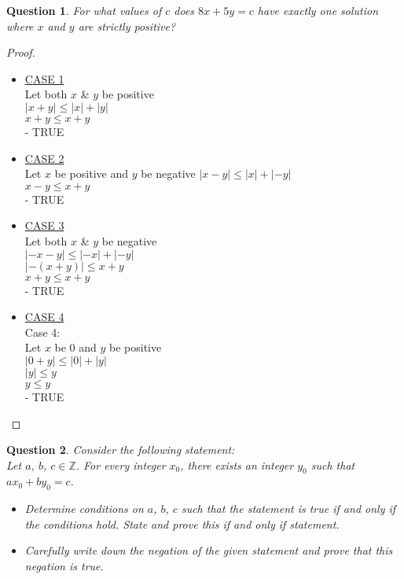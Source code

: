 \documentclass[11pt,oneside]{article}
\newtheorem{question}{Question}
\begin{document}
\begin{question}
    For what values of $c$ does $8x + 5y = c$ have exactly one solution where $x$ and $y$ are strictly positive?
\end{question}
\begin{proof}
    \begin{itemize}
        \item \underline{CASE 1} \\
            Let both $x$ \& $y$ be positive \\
            $|x + y| \leq |x| + |y|$ \\
            $x + y \leq x + y$ \\
            - TRUE
        \item \underline{CASE 2}  \\
            Let $x$ be positive and $y$ be negative
            $|x - y| \leq |x| + |-y|$ \\
            $ x - y \leq x + y$ \\
            - TRUE
        \item \underline{CASE 3}  \\
            Let both $x$ \& $y$ be negative \\
            $|-x - y| \leq |-x| + |-y|$ \\
            $|-(x + y)| \leq x + y$ \\
            $x + y \leq x + y$ \\
            - TRUE
        \item \underline{CASE 4} \\
            Case 4: \\
            Let $x$ be 0 and $y$ be positive \\
            $|0 + y| \leq |0| + |y|$ \\
            $|y| \leq y$ \\
            $y \leq y$ \\
            - TRUE
    \end{itemize}
\end{proof}

\bigskip

\begin{question}
    Consider the following statement: \\
    Let $a$, $b$, $c \in \mathbb{Z}$. For every integer $x_0$, there exists an integer $y_0$ such that $ax_0 + by_0 = c$.\\
    \begin{itemize}
    	\item [(a)] Determine conditions on $a$, $b$, $c$ such that the statement is true if and only if the conditions hold. State and prove this if and only if statement.
    	\item[(b)] Carefully write down the negation of the given statement and prove that this negation is true.
    \end{itemize}
\end{question}
\end{document}
